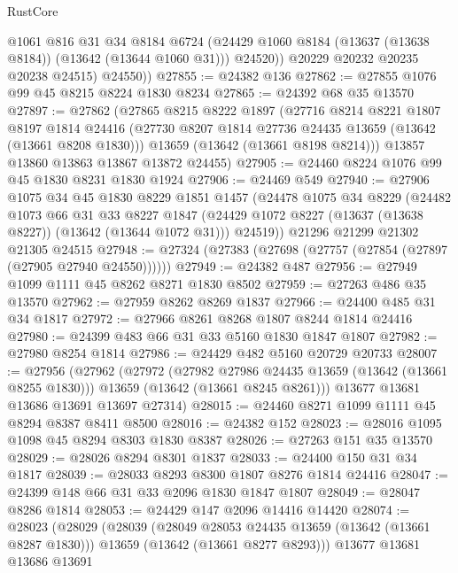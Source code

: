 \begin{lexlean}{RustCore}
\begin{coremodule}
              @1061
              @816
              @31
              @34
              @8184
              @6724
              (@24429 @1060 @8184 (@13637 (@13638 @8184)) (@13642 (@13644 @1060 @31)))
              @24520))
          @20229
          @20232
          @20235
          @20238
          @24515)
        @24550))
@27855 := @24382 @136
@27862 := @27855 @1076 @99 @45 @8215 @8224 @1830 @8234
@27865 := @24392 @68 @35 @13570
@27897 := @27862
    (@27865
      @8215
      @8222
      @1897
      (@27716
        @8214
        @8221
        @1807
        @8197
        @1814
        @24416
        (@27730 @8207 @1814 @27736 @24435 @13659 (@13642 (@13661 @8208 @1830)))
        @13659
        (@13642 (@13661 @8198 @8214)))
      @13857
      @13860
      @13863
      @13867
      @13872
      @24455)
@27905 := @24460 @8224 @1076 @99 @45 @1830 @8231 @1830 @1924
@27906 := @24469 @549
@27940 := @27906
    @1075
    @34
    @45
    @1830
    @8229
    @1851
    @1457
    (@24478
      @1075
      @34
      @8229
      (@24482
        @1073
        @66
        @31
        @33
        @8227
        @1847
        (@24429 @1072 @8227 (@13637 (@13638 @8227)) (@13642 (@13644 @1072 @31)))
        @24519))
    @21296
    @21299
    @21302
    @21305
    @24515
@27948 := @27324 (@27383 (@27698 (@27757 (@27854 (@27897 (@27905 @27940 @24550))))))
@27949 := @24382 @487
@27956 := @27949 @1099 @1111 @45 @8262 @8271 @1830 @8502
@27959 := @27263 @486 @35 @13570
@27962 := @27959 @8262 @8269 @1837
@27966 := @24400 @485 @31 @34 @1817
@27972 := @27966 @8261 @8268 @1807 @8244 @1814 @24416
@27980 := @24399 @483 @66 @31 @33 @5160 @1830 @1847 @1807
@27982 := @27980 @8254 @1814
@27986 := @24429 @482 @5160 @20729 @20733
@28007 := @27956
    (@27962
      (@27972
        (@27982 @27986 @24435 @13659 (@13642 (@13661 @8255 @1830)))
        @13659
        (@13642 (@13661 @8245 @8261)))
      @13677
      @13681
      @13686
      @13691
      @13697
      @27314)
@28015 := @24460 @8271 @1099 @1111 @45 @8294 @8387 @8411 @8500
@28016 := @24382 @152
@28023 := @28016 @1095 @1098 @45 @8294 @8303 @1830 @8387
@28026 := @27263 @151 @35 @13570
@28029 := @28026 @8294 @8301 @1837
@28033 := @24400 @150 @31 @34 @1817
@28039 := @28033 @8293 @8300 @1807 @8276 @1814 @24416
@28047 := @24399 @148 @66 @31 @33 @2096 @1830 @1847 @1807
@28049 := @28047 @8286 @1814
@28053 := @24429 @147 @2096 @14416 @14420
@28074 := @28023
    (@28029
      (@28039
        (@28049 @28053 @24435 @13659 (@13642 (@13661 @8287 @1830)))
        @13659
        (@13642 (@13661 @8277 @8293)))
      @13677
      @13681
      @13686
      @13691

\end{coremodule}
\end{lexlean}
